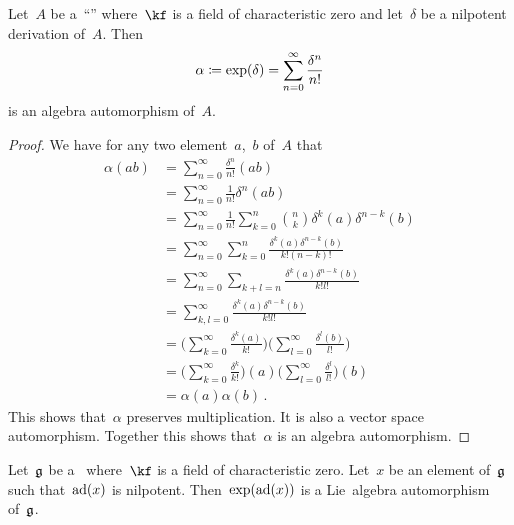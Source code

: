 \begin{proposition}
  \label{exponential of derivation is automorphism}
  Let~$A$ be a~\enquote{\algebra{$\kf$}} where~$\kf$ is a field of characteristic zero and let~$\delta$ be a nilpotent derivation of~$A$.
  Then
  \[
    \alpha
    \coloneqq
    \exp(\delta)
    =
    \sum_{n=0}^\infty \frac{\delta^n}{n!}
  \]
  is an algebra automorphism of~$A$.
\end{proposition}


\begin{proof}
  We have for any two element~$a$,~$b$ of~$A$ that
  \begingroup
  \allowdisplaybreaks
  \begin{align*}
    \alpha(ab)
    &=
    \sum_{n=0}^\infty
    \frac{\delta^n}{n!}(ab)
    \\
    &=
    \sum_{n=0}^\infty
    \frac{1}{n!}
    \delta^n(ab)
    \\
    &=
    \sum_{n=0}^\infty
    \frac{1}{n!}
    \sum_{k=0}^n
    \binom{n}{k}
    \delta^k(a) \delta^{n-k}(b)
    \\
    &=
    \sum_{n=0}^\infty
    \sum_{k=0}^n
    \frac{\delta^k(a) \delta^{n-k}(b)}{k! (n-k)!}
    \\
    &=
    \sum_{n=0}^\infty
    \sum_{k+l=n}
    \frac{\delta^k(a) \delta^{n-k}(b)}{k! l!}
    \\
    &=
    \sum_{k,l = 0}^\infty
    \frac{\delta^k(a) \delta^{n-k}(b)}{k! l!}
    \\
    &=
    \Biggl(
      \sum_{k=0}^\infty
      \frac{\delta^k(a)}{k!}
    \Biggr)
    \Biggl(
      \sum_{l=0}^\infty
      \frac{\delta^l(b)}{l!}
    \Biggr)
    \\
    &=
    \Biggl(
      \sum_{k=0}^\infty
      \frac{\delta^k}{k!}
    \Biggr)
    (a)
    \Biggl(
      \sum_{l=0}^\infty
      \frac{\delta^l}{l!}
    \Biggr)
    (b)
    \\
    &=
    \alpha(a) \alpha(b) \,. 
  \end{align*}
  \endgroup
  This shows that~$\alpha$ preserves multiplication.
  It is also a vector space automorphism.
  Together this shows that~$\alpha$ is an algebra automorphism.
\end{proof}


\begin{corollary}
  Let~$\mathfrak{g}$ be a~\liealgebra{$\kf$} where~$\kf$ is a field of characteristic zero.
  Let~$x$ be an element of~$\mathfrak{g}$ such that~$\operatorname{ad}(x)$ is nilpotent.
  Then~$\exp(\operatorname{ad}(x))$ is a Lie~algebra automorphism of~$\mathfrak{g}$.
\end{corollary}



